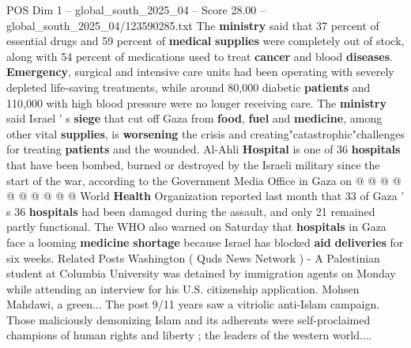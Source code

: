 \begin{textsample}{POS Dim 1 – global\_south\_2025\_04 – Score 28.00 – global\_south\_2025\_04/123590285.txt}
The \textbf{ministry} said that 37 percent of essential drugs and 59 percent of \textbf{medical} \textbf{supplies} were completely out of stock, along with 54 percent of medications used to treat \textbf{cancer} and blood \textbf{diseases}. \textbf{Emergency}, surgical and intensive care units had been operating with severely depleted life-saving treatments, while around 80,000 diabetic \textbf{patients} and 110,000 with high blood pressure were no longer receiving care.
The \textbf{ministry} said Israel ' s \textbf{siege} that cut off Gaza from \textbf{food}, \textbf{fuel} and \textbf{medicine}, among other vital \textbf{supplies}, is \textbf{worsening} the crisis and creating"catastrophic"challenges for treating \textbf{patients} and the wounded.
Al-Ahli \textbf{Hospital} is one of 36 \textbf{hospitals} that have been bombed, burned or destroyed by the Israeli military since the start of the war, according to the Government Media Office in Gaza on @ @ @ @ @ @ @ @ @ @ World \textbf{Health} Organization reported last month that 33 of Gaza ' s 36 \textbf{hospitals} had been damaged during the assault, and only 21 remained partly functional.
The WHO also warned on Saturday that \textbf{hospitals} in Gaza face a looming \textbf{medicine} \textbf{shortage} because Israel has blocked \textbf{aid} \textbf{deliveries} for six weeks.
Related Posts Washington ( Quds News Network ) - A Palestinian student at Columbia University was detained by immigration agents on Monday while attending an interview for his U.S. citizenship application.
Mohsen Mahdawi, a green...
The post 9/11 years saw a vitriolic anti-Islam campaign.
Those maliciously demonizing Islam and its adherents were self-proclaimed champions of human rights and liberty ; the leaders of the western world....

\end{textsample}
